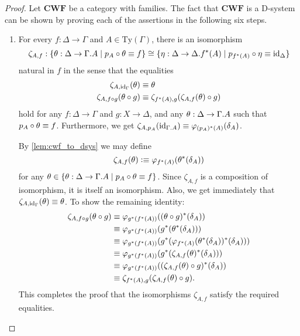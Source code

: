 \begin{proof}%
Let $\mathbf{CWF}$ be a category with families. The fact that $\mathbf{CWF}$ is
a D-system can be shown by proving each of the assertions in the following six 
steps.
\begin{enumerate}
\item For every $f:\Delta\to\Gamma$ and $A\in\mathrm{Ty}(\Gamma)$, there is an
isomorphism
\begin{equation*}
\zeta_{A,f}:\{\theta:\Delta\to\ctxext{\Gamma}{A}\mid p_A\circ\theta\jdeq f\}
  \cong
\{\eta:\Delta\to\ctxext{\Delta}{f^\ast(A)}\mid p_{f^\ast(A)}\circ\eta\jdeq\catid{\Delta}\}
\end{equation*}
natural in $f$ in the sense that the equalities
\begin{align*}
\zeta_{A,{\mathrm{id}_{\Gamma}}}(\theta) & \equiv \theta \\
\zeta_{A,f\circ g}(\theta\circ g) & \equiv \zeta_{f^\ast(A),g}(\zeta_{A,f}(\theta)\circ g)
\end{align*}
hold for any $f:\Delta\to\Gamma$ and $g:X\to\Delta$, and any $\theta:\Delta\to\ctxext{\Gamma}{A}$
such that $p_A\circ\theta\equiv f$.
Furthermore, we get $\zeta_{A,p_A}(\catid{\ctxext{\Gamma}{A}})\jdeq\varphi_{(p_A)^\ast(A)}(\delta_A)$.

\medskip
By \autoref{lem:cwf_to_dsys} we may define
\begin{equation*}
\zeta_{A,f}(\theta)\vcentcolon\equiv \varphi_{f^\ast(A)}(\theta^\ast(\delta_A))
\end{equation*}
for any $\theta\in\{\theta:\Delta\to\ctxext{\Gamma}{A}\mid p_A\circ\theta\jdeq f\}$. 
Since $\zeta_{A,f}$ is a composition of isomorphism, it is itself an isomorphism.
Also, we get immediately that $\zeta_{A,{\mathrm{id}_{\Gamma}}}(\theta)\equiv\theta$. To
show the remaining identity:
\begin{align*}
\zeta_{A,f\circ g}(\theta\circ g)
& \equiv \varphi_{g^\ast(f^\ast(A))}((\theta\circ g)^\ast(\delta_A)) \\
& \equiv \varphi_{g^\ast(f^\ast(A))}(g^\ast(\theta^\ast(\delta_A))) \\
& \equiv \varphi_{g^\ast(f^\ast(A))}(g^\ast(\varphi_{f^\ast(A)}(\theta^\ast(\delta_A))^\ast(\delta_A))) \\
& \equiv \varphi_{g^\ast(f^\ast(A))}(g^\ast(\zeta_{A,f}(\theta)^\ast(\delta_A))) \\
& \equiv \varphi_{g^\ast(f^\ast(A))}((\zeta_{A,f}(\theta)\circ g)^\ast(\delta_A)) \\
& \equiv \zeta_{f^\ast(A),g}(\zeta_{A,f}(\theta)\circ g).
\end{align*}
This completes the proof that the isomorphisms $\zeta_{A,f}$ satisfy the required
equalities.


\end{enumerate}
\end{proof}
